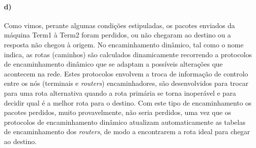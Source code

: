 \paragraph{d)}
Como vimos, perante algumas condições estipuladas, os pacotes enviados da máquina \textsf{Term1} à \textsf{Term2} foram perdidos, ou não chegaram ao destino ou a resposta não chegou à origem.
No encaminhamento dinâmico, tal como o nome indica, as rotas (caminhos) são calculados dinamicamente recorrendo a protocolos de encaminhamento dinâmico que se adaptam a possíveis alterações que acontecem na rede. Estes protocolos envolvem a troca de informação de controlo entre os nós (terminais e \emph{routers}) encaminhadores, são desenvolvidos para trocar para uma rota alternativa quando a rota primária se torna inoperável e para decidir qual é a melhor rota para o destino.
Com este tipo de encaminhamento os pacotes perdidos, muito provavelmente, não seria perdidos, uma vez que os protocolos de encaminhamento dinâmico atualizam automaticamente as tabelas de encaminhamento dos \emph{routers}, de modo a encontrarem a rota ideal para chegar ao destino.

